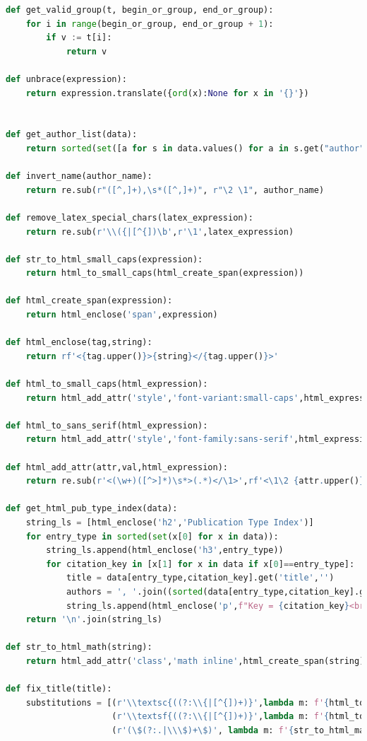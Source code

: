 \documentclass[11pt,a4paper]{report}
\begin{document}
\begin{appendices}
\begin{lstlisting}[language=python]
def get_valid_group(t, begin_or_group, end_or_group):
    for i in range(begin_or_group, end_or_group + 1):
        if v := t[i]:
            return v

def unbrace(expression):
    return expression.translate({ord(x):None for x in '{}'})


def get_author_list(data):
    return sorted(set([a for s in data.values() for a in s.get("author", [])]))

def invert_name(author_name):
    return re.sub(r"([^,]+),\s*([^,]+)", r"\2 \1", author_name)

def remove_latex_special_chars(latex_expression):
    return re.sub(r'\\({|[^{])\b',r'\1',latex_expression)

def str_to_html_small_caps(expression):
    return html_to_small_caps(html_create_span(expression))

def html_create_span(expression):
    return html_enclose('span',expression)

def html_enclose(tag,string):
    return rf'<{tag.upper()}>{string}</{tag.upper()}>'

def html_to_small_caps(html_expression):
    return html_add_attr('style','font-variant:small-caps',html_expression)

def html_to_sans_serif(html_expression):
    return html_add_attr('style','font-family:sans-serif',html_expression)

def html_add_attr(attr,val,html_expression):
    return re.sub(r'<(\w+)([^>]*)\s*>(.*)</\1>',rf'<\1\2 {attr.upper()}="{val}">\3</\1>',html_expression)

def get_html_pub_type_index(data):
    string_ls = [html_enclose('h2','Publication Type Index')]
    for entry_type in sorted(set(x[0] for x in data)):
        string_ls.append(html_enclose('h3',entry_type))
        for citation_key in [x[1] for x in data if x[0]==entry_type]:
            title = data[entry_type,citation_key].get('title','')
            authors = ', '.join((sorted(data[entry_type,citation_key].get('author',''))))
            string_ls.append(html_enclose('p',f"Key = {citation_key}<br>Title = {fix_title(title)}<br>Autores = {authors}"))
    return '\n'.join(string_ls)

def str_to_html_math(string):
    return html_add_attr('class','math inline',html_create_span(string))

def fix_title(title):
    substitutions = [(r'\\textsc{((?:\\{|[^{])+)}',lambda m: f'{html_to_small_caps(html_create_span(m.group(1)))}'),
                     (r'\\textsf{((?:\\{|[^{])+)}',lambda m: f'{html_to_sans_serif(html_create_span(m.group(1)))}'),
                     (r'(\$(?:.|\\\$)+\$)', lambda m: f'{str_to_html_math(m.group(1))}')]



\end{lstlisting}
\end{appendices}
\end{document}
